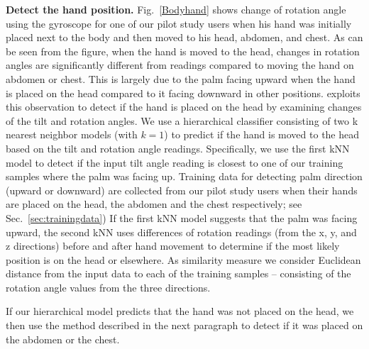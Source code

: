 \textbf{Detect the hand position.}  Fig.~\ref{Bodyhand} shows change of rotation angle using the gyroscope for one of our pilot study users when his hand was initially placed next to the body and then moved to his head, abdomen, and chest. As can be seen from the figure, when the hand is moved to the head, changes in rotation angles are significantly different from readings {compared to moving the hand on abdomen or chest}. This is largely due to the {palm facing upward when the hand is placed on the head compared to it facing downward in other positions}. {\systemname} exploits this observation to detect if the hand is placed on the head by examining changes of the {tilt} and rotation angles. We use a hierarchical classifier consisting of two {k nearest neighbor} models (with $k=1$) to predict if the hand is moved to the head based on the tilt and rotation angle readings. Specifically, we use the first kNN model to detect if the input tilt angle reading is closest to one of our training samples where the palm was {facing up. Training data for detecting palm direction (upward or downward) are collected} from our pilot study users when their hands are placed on the head, the abdomen and the chest respectively; see Sec.~\ref{sec:trainingdata}) If the first kNN model suggests that the palm was facing upward, {the second kNN uses differences of rotation readings (from the x, y, and z directions) before and after hand  movement to determine if the most likely position is on the head or elsewhere. As similarity measure we consider}  Euclidean distance from the input data to each of the training samples -- consisting of the rotation angle values from the three directions.

If our hierarchical model predicts that the hand was not placed on the head, we then use the method
described in the next paragraph to detect if it was placed on the abdomen or the chest.

